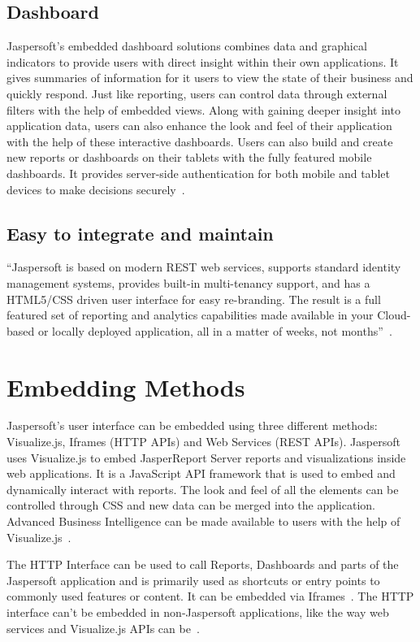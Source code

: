 \subsection{Dashboard}
Jaspersoft's embedded dashboard solutions combines data and graphical indicators
to provide users with direct insight within their own applications. It gives
summaries of information for it users to view the state of their business and
quickly respond. Just like reporting, users can control data through external
filters with the help of embedded views. Along with gaining deeper insight into
application data, users can also enhance the look and feel of their application
with the help of these interactive dashboards. Users can also build and create
new reports or dashboards on their tablets with the fully featured mobile
dashboards. It provides server-side authentication for both mobile and tablet
devices to make decisions
securely~\cite{hid-sp18-516-www-jaspersoft-dashboards}. 

\subsection{Easy to integrate and maintain}
``Jaspersoft is based on modern REST web services, supports standard identity
management systems, provides built-in multi-tenancy support, and has a HTML5/CSS
driven user interface for easy re-branding. The result is a full featured set of
reporting and analytics capabilities made available in your Cloud-based or
locally deployed application, all in a matter of weeks, not 
months''~\cite{hid-sp18-516-www-embedded-bi}.


\section{Embedding Methods}
Jaspersoft's user interface can be embedded using three different methods:
Visualize.js, Iframes (HTTP APIs) and Web Services (REST APIs). Jaspersoft uses
Visualize.js to embed JasperReport Server reports and visualizations inside web
applications. It is a JavaScript API framework that is used to embed and
dynamically interact with reports. The look and feel of all the elements can be
controlled through CSS and new data can be merged into the application. Advanced
Business Intelligence can be made available to users with the help of
Visualize.js~\cite{hid-sp18-516-www-jaspersoft-visualize-js}. 

The HTTP Interface can be used to call Reports, Dashboards and parts of the
Jaspersoft application and is primarily used as shortcuts or entry points to
commonly used features or content. It can be embedded via
Iframes~\cite{hid-sp18-516-www-jaspersoft-http-api1}. The HTTP interface can't
be embedded in non-Jaspersoft applications, like the way web services and
Visualize.js APIs can be~\cite{hid-sp18-516-www-jaspersoft-http-api2}.

